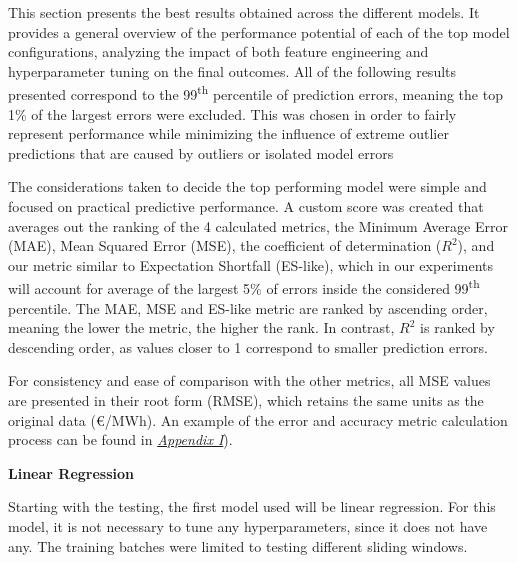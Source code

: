 \documentclass[12pt]{report} %
\begin{document}
This section presents the best results obtained across the different models. It provides a general overview of the performance potential of each of the top model configurations, analyzing the impact of both feature engineering and hyperparameter tuning on the final outcomes. All of the following results presented correspond to the 99\textsuperscript{th} percentile of prediction errors, meaning the top 1\% of the largest errors were excluded. This was chosen in order to fairly represent performance while minimizing the influence of extreme outlier predictions that are caused by outliers or isolated model errors


The considerations taken to decide the top performing model were simple and focused on practical predictive performance. A custom score was created that averages out the ranking of the 4 calculated metrics, the Minimum Average Error (MAE), Mean Squared Error (MSE), the coefficient of determination ($R^2$), and our metric similar to Expectation Shortfall (ES-like), which in our experiments will account for average of the largest 5\% of errors inside the considered 99\textsuperscript{th} percentile. The MAE, MSE and ES-like metric are ranked by ascending order, meaning the lower the metric, the higher the rank. In contrast, $R^2$ is ranked by descending order, as values closer to 1 correspond to smaller prediction errors.


For consistency and ease of comparison with the other metrics, all MSE values are presented in their root form (RMSE), which retains the same units as the original data (€/MWh). An example of the error and accuracy metric calculation process can be found in \textit{\hyperref[app:appendix_i_example_metric_calculation_process]{Appendix I}}). 


\noindent \textbf{Linear Regression}

Starting with the testing, the first model used will be linear regression. For this model, it is not necessary to tune any hyperparameters, since it does not have any. The training batches were limited to testing different sliding windows.
\end{document}
